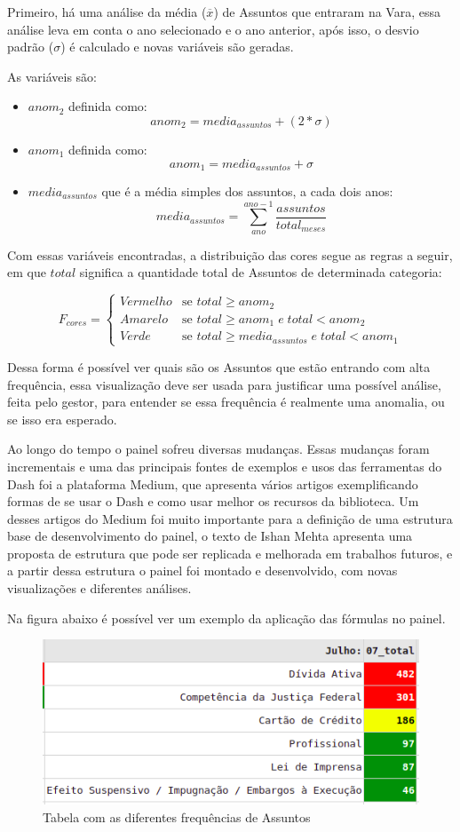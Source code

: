 Primeiro, há uma análise da média ($\overline{x}$) de Assuntos que entraram na Vara, essa análise leva em conta o ano selecionado e o ano anterior, após isso, o desvio padrão ($\sigma$) é calculado e novas variáveis são geradas.

As variáveis são:
\begin{itemize}
	\item $anom_2$ definida como: $$anom_2 = media_{assuntos} + (2*\sigma)$$
	
	\item $anom_1$ definida como: $$anom_1 = media_{assuntos} + \sigma$$
	
	\item $media_{assuntos}$ que é a média simples dos assuntos, a cada dois anos:
	$$media_{assuntos} = \sum\limits_{ano}^{ano-1}\frac{assuntos}{total_{meses}}$$
\end{itemize}

Com essas variáveis encontradas, a distribuição das cores segue as regras a seguir, em que $total$ significa a quantidade total de Assuntos de determinada categoria:

\begin{equation}
	F_{cores} =
	\begin{cases}
		Vermelho & \text{se $total \geq anom_2$}\\
		Amarelo & \text{se $total \geq anom_1 \;e\; total < anom_2$}\\
		Verde & \text{se $total \geq media_{assuntos} \;e\; total < anom_1$}
	\end{cases}       
\end{equation}

Dessa forma é possível ver quais são os Assuntos que estão entrando com alta frequência, essa visualização deve ser usada para justificar uma possível análise, feita pelo gestor, para entender se essa frequência é realmente uma anomalia, ou se isso era esperado.

Ao longo do tempo o painel sofreu diversas mudanças. Essas mudanças foram incrementais e uma das principais fontes de exemplos e usos das ferramentas do Dash foi a plataforma Medium, que apresenta vários artigos exemplificando formas de se usar o Dash e como usar melhor os recursos da biblioteca. Um desses artigos do Medium foi muito importante para a definição de uma estrutura base de desenvolvimento do painel, o texto de Ishan Mehta \cite{medium1} apresenta uma proposta de estrutura que pode ser replicada e melhorada em trabalhos futuros, e a partir dessa estrutura o painel foi montado e desenvolvido, com novas visualizações e diferentes análises.

Na figura abaixo é possível ver um exemplo da aplicação das fórmulas no painel.
\begin{figure}[h]
	\centering
	\includegraphics[scale=0.65]{./figures/cap2/exemplo_painel.png}
	\caption{Tabela com as diferentes frequências de Assuntos}
\end{figure}
